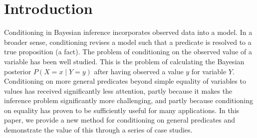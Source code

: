 
\section{Introduction}

Conditioning in Bayesian inference incorporates observed data into a model.
In a broader sense, conditioning revises a model such that a predicate is resolved to a true proposition (a fact).
The problem of conditioning on the observed value of a variable has been well studied.
This is the problem of calculating the Bayesian posterior $P(X = x \mid Y = y)$ after having observed a value $y$ for variable $Y$.
Conditioning on more general predicates beyond simple equality of variables to values has received significantly less attention, partly because it makes the inference problem significantly more challenging, and partly because conditioning on equality has proven to be sufficiently useful for many applications. In this paper, we provide a new method for conditioning on general predicates and demonstrate the value of this through a series of case studies.




